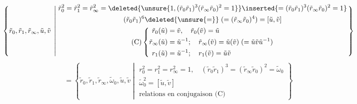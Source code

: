 \[
\left\{\tilde r_0,\tilde r_1,\tilde r_\infty,\tilde u,\tilde v\;\left|\;
\begin{gathered}
\tilde r_0^2=\tilde r_1^2=\tilde r_\infty^2=
\deleted{\unsure{1,(\tilde r_0\tilde r_1)^3(\tilde r_\infty\tilde r_0)^2=1}}
\inserted{=(\tilde r_0\tilde r_1)^3(\tilde r_\infty\tilde r_0)^2=1}\\
(\tilde r_0\tilde r_1)^6\deleted{\unsure{=}}\;(=(\tilde r_\infty\tilde r_0)^4)=[\tilde u,\tilde v]\\
\text{(C)}\left\{\begin{aligned}
\tilde r_0(\tilde u)&=\tilde v,\quad\tilde r_0(\tilde v)=\tilde u\\
\tilde r_\infty(\tilde u)&=\tilde u^{-1};\quad\tilde r_\infty(\tilde v)=\tilde u(\tilde v)\;(=\tilde u\tilde v\tilde u^{-1})\\
r_1(\tilde u)&=\tilde u^{-1};\quad r_1(\tilde v)=\tilde u\tilde v
\end{aligned}\right.
\end{gathered}\right.\right\}
\]
\[
=\left\{\tilde r_0,\tilde r_1,\tilde r_\infty,\tilde\omega_0,\tilde u,\tilde v\;\left|\;
\begin{gathered}
r_0^2=r_1^2=r_\infty^2=1,\quad(\tilde r_0\tilde r_1)^3=(\tilde r_\infty\tilde r_0)^2=\tilde\omega_0\\
\tilde\omega_0^2=[\tilde u,\tilde v]\\
\text{relations en conjugaison (C)}
\end{gathered}\right.\right\}
\]
